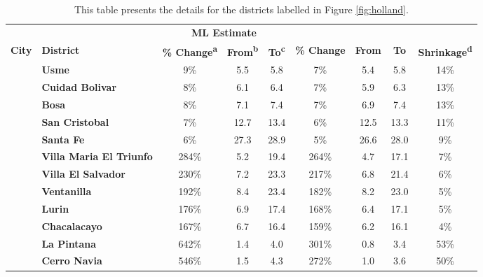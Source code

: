 \begin{table}[!h]

\caption{\label{tab:}\label{tab:top-5}This table presents the details for the districts labelled in Figure \ref{fig:holland}.}
\centering
\fontsize{8}{10}\selectfont
\begin{tabular}[t]{>{\bfseries}l>{\bfseries}lccccccc}
\toprule
\multicolumn{2}{c}{\bfseries  } & \multicolumn{3}{c}{\bfseries Average of Simulations} & \multicolumn{3}{c}{\bfseries ML Estimate} & \multicolumn{1}{c}{\bfseries  } \\
\cmidrule(l{2pt}r{2pt}){3-5} \cmidrule(l{2pt}r{2pt}){6-8}
\textbf{City} & \textbf{District} & \textbf{\% Change\textsuperscript{a}} & \textbf{From\textsuperscript{b}} & \textbf{To\textsuperscript{c}} & \textbf{\% Change} & \textbf{From} & \textbf{To} & \textbf{Shrinkage\textsuperscript{d}}\\
\midrule
 & Usme & 9\% & 5.5 & 5.8 & 7\% & 5.4 & 5.8 & 14\%\\

 & Cuidad Bolivar & 8\% & 6.1 & 6.4 & 7\% & 5.9 & 6.3 & 13\%\\

 & Bosa & 8\% & 7.1 & 7.4 & 7\% & 6.9 & 7.4 & 13\%\\

 & San Cristobal & 7\% & 12.7 & 13.4 & 6\% & 12.5 & 13.3 & 11\%\\

\multirow{-5}{*}{\raggedright\arraybackslash Bogota} & Santa Fe & 6\% & 27.3 & 28.9 & 5\% & 26.6 & 28.0 & 9\%\\
\cmidrule{1-9}
 & Villa Maria El Triunfo & 284\% & 5.2 & 19.4 & 264\% & 4.7 & 17.1 & 7\%\\

 & Villa El Salvador & 230\% & 7.2 & 23.3 & 217\% & 6.8 & 21.4 & 6\%\\

 & Ventanilla & 192\% & 8.4 & 23.4 & 182\% & 8.2 & 23.0 & 5\%\\

 & Lurin & 176\% & 6.9 & 17.4 & 168\% & 6.4 & 17.1 & 5\%\\

\multirow{-5}{*}{\raggedright\arraybackslash Lima} & Chacalacayo & 167\% & 6.7 & 16.4 & 159\% & 6.2 & 16.1 & 4\%\\
\cmidrule{1-9}
 & La Pintana & 642\% & 1.4 & 4.0 & 301\% & 0.8 & 3.4 & 53\%\\

 & Cerro Navia & 546\% & 1.5 & 4.3 & 272\% & 1.0 & 3.6 & 50\%\\


\end{tabular}
\end{table}
